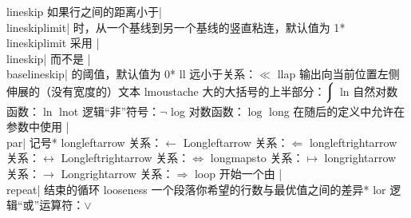 \capcs lineskip {如果行之间的距离小于|\\lineskiplimit| 时，从一个基线到另一个基线的竖直粘连，默认值为 1\pt}*{}
\capcs lineskiplimit {采用 |\\lineskip| 而不是 |\\base\-line\-skip| 的阈值，默认值为 0\pt}*{}
\capcs ll {远小于关系：$\ll$}{}{}
\capcs llap {输出向当前位置左侧伸展的（没有宽度的）文本}{}{}
\capcs lmoustache {大的大括号的上半部分：$\big\lmoustache$}{}{}
\capcs ln {自然对数函数：$\ln$}{}{}
\capcs lnot {逻辑“非”符号：$\lnot$}{}{}
\capcs log {对数函数：$\log$}{}{}
\capcs long {在随后的定义中允许在参数中使用 |\\par| 记号}*{}
\capcs longleftarrow {关系：$\longleftarrow$}{}{}
\capcs Longleftarrow {关系：$\Longleftarrow$}{}{}
\capcs longleftrightarrow {关系：$\longleftrightarrow$}{}{}
\capcs Longleftrightarrow {关系：$\Longleftrightarrow$}{}{}
\capcs longmapsto {关系：$\longmapsto$}{}{}
\capcs longrightarrow {关系：$\longrightarrow$}{}{}
\capcs Longrightarrow {关系：$\Longrightarrow$}{}{}
\capcs loop {开始一个由 |\\repeat| 结束的循环}{}{}
\capcs looseness {一个段落你希望的行数与最优值之间的差异}*{}
\capcs lor {逻辑“或”运算符：$\lor$}{}{}
